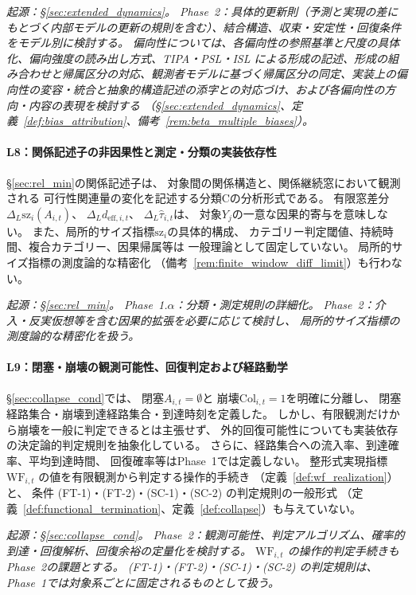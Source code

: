 \medskip
\noindent\textit{起源：\S\ref{sec:extended_dynamics}。
Phase~2：具体的更新則（予測と実現の差にもとづく内部モデルの更新の規則を含む）、結合構造、収束・安定性・回復条件をモデル別に検討する。
偏向性については、各偏向性の参照基準と尺度の具体化、偏向強度の読み出し方式、TIPA・PSL・ISL による形成の記述、形成の組み合わせと帰属区分の対応、観測者モデルに基づく帰属区分の同定、実装上の偏向性の変容・統合と抽象的構造記述の添字との対応づけ、および各偏向性の方向・内容の表現を検討する
（\S\ref{sec:extended_dynamics}、定義~\ref{def:bias_attribution}、備考~\ref{rem:beta_multiple_biases}）。}

\paragraph{L8：関係記述子の非因果性と測定・分類の実装依存性}
\label{lim:L8}
\S\ref{sec:rel_min}の関係記述子は、
対象間の関係構造と、関係継続窓において観測される
可行性関連量の変化を記述する分類Cの分析形式である。
有限窓差分
$\Delta_L\mathrm{sz}_i(A_{i,t})$、
$\Delta_Ld_{\mathrm{eff},i,t}$、
$\Delta_L\widehat{\tau}_{i,t}$は、
対象$Y_j$の一意な因果的寄与を意味しない。
また、局所的サイズ指標$\mathrm{sz}_i$の具体的構成、
カテゴリー判定閾値、持続時間、複合カテゴリー、因果帰属等は
一般理論として固定していない。
局所的サイズ指標の測度論的な精密化
（備考~\ref{rem:finite_window_diff_limit}）も行わない。

\medskip
\noindent\textit{起源：\S\ref{sec:rel_min}。
Phase~1.$\alpha$：分類・測定規則の詳細化。
Phase~2：介入・反実仮想等を含む因果的拡張を必要に応じて検討し、
局所的サイズ指標の測度論的な精密化を扱う。}

\paragraph{L9：閉塞・崩壊の観測可能性、回復判定および経路動学}
\label{lim:L9}
\S\ref{sec:collapse_cond}では、
閉塞$A_{i,t}=\emptyset$と
崩壊$\mathrm{Col}_{i,t}=1$を明確に分離し、
閉塞経路集合・崩壊到達経路集合・到達時刻を定義した。
しかし、有限観測だけから崩壊を一般に判定できるとは主張せず、
外的回復可能性についても実装依存の決定論的判定規則を抽象化している。
さらに、経路集合への流入率、到達確率、平均到達時間、
回復確率等はPhase~1では定義しない。
整形式実現指標 $\mathrm{WF}_{i,t}$ の値を有限観測から判定する操作的手続き
（定義~\ref{def:wf_realization}）と、
条件 (FT-1)・(FT-2)・(SC-1)・(SC-2) の判定規則の一般形式
（定義~\ref{def:functional_termination}、定義~\ref{def:collapse}）も与えていない。

\medskip
\noindent\textit{起源：\S\ref{sec:collapse_cond}。
Phase~2：観測可能性、判定アルゴリズム、確率的到達・回復解析、回復余裕の定量化を検討する。
$\mathrm{WF}_{i,t}$ の操作的判定手続きもPhase~2の課題とする。
(FT-1)・(FT-2)・(SC-1)・(SC-2) の判定規則は、
Phase~1では対象系ごとに固定されるものとして扱う。}


